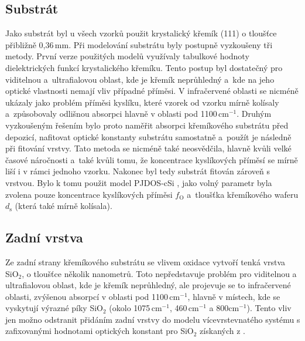 \subsection{Substrát}
Jako substrát byl u všech vzorků použit krystalický křemík (111) o tloušťce přibližně 0,36\,mm. Při modelování substrátu byly postupně vyzkoušeny tři metody. První verze použitých modelů využívaly tabulkové hodnoty dielektrických funkcí krystalického kře\-mí\-ku. Tento postup byl dostatečný pro viditelnou a~ultrafialovou oblast, kde je křemík neprůhledný a~kde na jeho optické vlastnosti nemají vliv případné příměsi. V infračervené oblasti se nicméně ukázaly jako problém příměsi kyslíku, které vzorek od vzorku mírně kolísaly a~způsobovaly odlišnou absorpci hlavně v oblasti pod 1100\,cm$^{-1}$. Druhým vyzkoušeným řešením bylo proto naměřit absorpci křemíkového substrátu před depozicí, nafitovat optické konstanty substrátu samostatně a~použít je následně při fitování vrstvy. Tato metoda se nicméně také neosvědčila, hlavně kvůli velké časové náročnosti a~také kvůli tomu, že koncentrace kyslíkových příměsí se mírně liší i v rámci jednoho vzorku.
Nakonec byl tedy substrát fitován zároveň s vrstvou. Bylo k tomu použit model PJDOS-cSi \cite{}, jako volný parametr byla zvolena pouze koncentrace kyslíkových příměsi $f_\mathrm{O}$ a~tloušťka křemíkového waferu $d_\mathrm{s}$ (která také mírně kolísala).  

\subsection{Zadní vrstva}
Ze zadní strany křemíkového substrátu se vlivem oxidace vytvoří tenká vrstva SiO$_2$, o tloušťce několik nanometrů. Toto nepředstavuje problém pro viditelnou a ultrafialovou oblast, kde je křemík neprůhledný, ale projevuje se to infračervené oblasti, zvýšenou absorpcí v oblasti pod 1100\,cm$^{-1}$, hlavně v místech, kde se vyskytují výrazné píky SiO$_2$ (okolo 1075\,cm$^{-1}$, 460\,cm$^{-1}$ a 800cm$^{-1}$). Tento vliv jen možno odstranit přidáním zadní vrstvy do modelu vícevrstevnatého systému s zafixovanými hodnotami optických konstant pro SiO$_2$ získaných z \cite{palik1985handbook}.

\cleardoublepage
